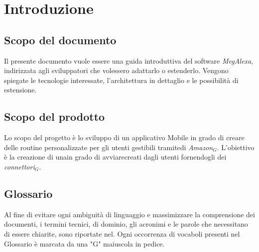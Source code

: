 \chapter{Introduzione}
\label{Introduzione}
\section{Scopo del documento}
Il presente documento vuole essere una guida introduttiva del software \textit{MegAlexa}, indirizzata agli sviluppatori che volessero adattarlo o estenderlo. Vengono spiegate le tecnologie interessate, l'architettura in dettaglio e le possibilità di estensione. 

\section{Scopo del prodotto}
Lo scopo del progetto è lo sviluppo di un applicativo Mobile in grado di creare delle routine personalizzate per gli utenti 
gestibili tramitedi \textit{Amazon$_{G}$}. L’obiettivo è la creazione di unain grado di avviarecreati dagli utenti fornendogli dei \textit{connettori$_{G}$}.

\section{Glossario}
Al fine di evitare ogni ambiguità di linguaggio e massimizzare la comprensione dei documenti, i termini tecnici, di dominio, gli acronimi e le parole che necessitano di essere chiarite, sono riportate nel\glossariodocumento.
Ogni occorrenza di vocaboli presenti nel Glossario è marcata da una "G" maiuscola in pedice.


